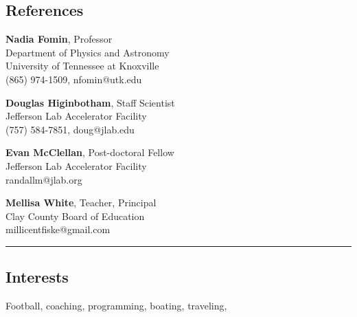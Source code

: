 \documentclass[12pt,letterpaper]{article}
\begin{document}
\subsection*{References}
\begin{multicols}{2}
	{\bf{Nadia Fomin}}, Professor\\
	Department of Physics and Astronomy\\ 
	University of Tennessee at Knoxville\\
	(865) 974-1509, nfomin@utk.edu\\
	\columnbreak
	
	{\bf{Douglas Higinbotham}}, Staff Scientist\\
	Jefferson Lab Accelerator Facility\\
	(757) 584-7851, doug@jlab.edu\\
\end{multicols}
\begin{multicols}{1}
		{\bf{Evan McClellan}}, Post-doctoral Fellow\\
	Jefferson Lab Accelerator Facility\\
	randallm@jlab.org\\
	\columnbreak
	
	{\bf{Mellisa White}}, Teacher, Principal\\
	Clay County Board of Education\\
	millicentfiske@gmail.com\\	
\end{multicols}


\hrule

\subsection*{Interests}

	Football, coaching, programming, boating, traveling,
\end{document}
